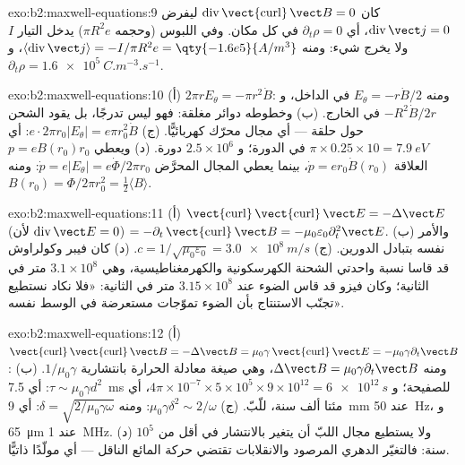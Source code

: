 \begin{solution}{exo:b2:maxwell-equations:9}
كان $\operatorname{div}\operatorname{\vect{curl}}\vect B = 0$ ليفرض $\operatorname{div}\vect j =
0$، أي $\partial_t\rho = 0$ في كل مكان. وفي اللبوس (وحجمه $\pi R^2e$) يدخل
التيار $I$ ولا يخرج شيء: ومنه $\langle\operatorname{div}\vect j\rangle =
-I/\pi R^2e = \qty{-1.6e5}{A/m^3}$، و $\partial_t\rho = \qty{+1.6e5}{C.m^{-3}.s^{-1}}$.
\end{solution}

\begin{solution}{exo:b2:maxwell-equations:10}
(أ) $2\pi rE_\theta = -\pi r^2\dot B$: ومنه $E_\theta = -r\dot B/2$ في الداخل، و $-R^2\dot B/2r$
في الخارج. (ب) وخطوطه دوائر مغلقة: فهو ليس تدرجًا، بل
يقود الشحن حول حلقة --- أي مجال محرّك كهربائيًّا. (ج) $e\cdot2\pi r_0
|E_\theta| = e\pi r_0^2\dot B$: أي $\pi \times 0.25 \times 10 = \qty{7.9}{eV}$ في الدورة؛ و $2.5 \times 10^6$
دورة. (د) ويعطي $p = eB(r_0)r_0$ العلاقة $\dot p = er_0\dot B(r_0)$، بينما يعطي المجال
المحرَّض $\dot p = e|E_\theta| = e\dot\Phi/2\pi r_0$: ومنه $B(r_0) = \Phi/2\pi r_0^2 =
\tfrac12\langle B\rangle$.
\end{solution}

\begin{solution}{exo:b2:maxwell-equations:11}
(أ) $\operatorname{\vect{curl}}\operatorname{\vect{curl}}\vect E = -\Delta\vect E$ (لأن $\operatorname{div}
\vect E = 0$) $= -\partial_t\operatorname{\vect{curl}}\vect B = -\mu_0\varepsilon_0\partial_t^2\vect E$. (ب)
والأمر نفسه بتبادل الدورين. (ج) $c = 1/\sqrt{\mu_0\varepsilon_0} = \qty{3.0e8}{m/s}$.
(د) كان فيبر وكولراوش قد قاسا نسبة واحدتي الشحنة
الكهرسكونية والكهرمغناطيسية، وهي $3.1 \times 10^8$ متر في الثانية؛ وكان فيزو قد
قاس الضوء عند $3.15 \times 10^8$ متر في الثانية: «فلا نكاد نستطيع تجنّب
الاستنتاج بأن الضوء تموّجات مستعرضة في
الوسط نفسه».
\end{solution}

\begin{solution}{exo:b2:maxwell-equations:12}
(أ) $\operatorname{\vect{curl}}\operatorname{\vect{curl}}\vect B = -\Delta\vect B = \mu_0\gamma\operatorname{\vect{curl}}
\vect E = -\mu_0\gamma\partial_t\vect B$: ومنه $\Delta\vect B = \mu_0\gamma\partial_t\vect B$، وهي صيغة
معادلة الحرارة بانتشارية $1/\mu_0\gamma$. (ب) $\tau \sim \mu_0\gamma d^2$: أي \qty{7.5}{ms}
للصفيحة؛ و $4\pi \times 10^{-7} \times 5 \times 10^5 \times 9 \times 10^{12} = \qty{6e12}{s}$، أي مئتا
ألف سنة، للّبّ. (ج) $\mu_0\gamma\delta^2 \sim 2/\omega$: ومنه $\delta = \sqrt{2/\mu_0
\gamma\omega}$: أي \qty{9}{mm} عند \qty{50}{Hz}، و \qty{65}{\micro m} عند \qty{1}{MHz}. (د) ولا يستطيع مجال
اللبّ أن يتغير بالانتشار في أقل من $10^5$ سنة: فالتغيّر
الدهري المرصود والانقلابات تقتضي حركة المائع
الناقل --- أي مولّدًا ذاتيًّا.
\end{solution}

